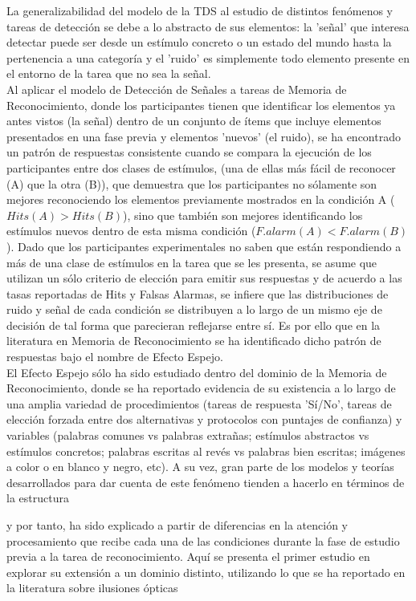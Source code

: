 La generalizabilidad del modelo de la TDS al estudio de distintos fenómenos y tareas de detección se debe a lo abstracto de sus elementos: la 'señal' que interesa detectar puede ser desde un estímulo concreto o un estado del mundo hasta la pertenencia a una categoría y el 'ruido' es simplemente todo elemento presente en el entorno de la tarea que no sea la señal.\\ 

Al aplicar el modelo de Detección de Señales a tareas de Memoria de Reconocimiento, donde los participantes tienen que identificar los elementos ya antes vistos (la señal) dentro de un conjunto de ítems que incluye elementos presentados en una fase previa y elementos 'nuevos' (el ruido), se ha encontrado un patrón de respuestas consistente cuando se compara la ejecución de los participantes entre dos clases de estímulos, (una de ellas más fácil de reconocer (A) que la otra (B)), que demuestra que los participantes no sólamente son mejores reconociendo los elementos previamente mostrados en la condición A ($Hits(A)>Hits(B)$), sino que también son mejores identificando los estímulos nuevos dentro de esta misma condición ($F.alarm(A)<F.alarm(B)$). Dado que los participantes experimentales no saben que están respondiendo a más de una clase de estímulos en la tarea que se les presenta, se asume que utilizan un sólo criterio de elección para emitir sus respuestas y de acuerdo a las tasas reportadas de Hits y Falsas Alarmas, se infiere que las distribuciones de ruido y señal de cada condición se distribuyen a lo largo de un mismo eje de decisión de tal forma que parecieran reflejarse entre sí. Es por ello que en la literatura en Memoria de Reconocimiento se ha identificado dicho patrón de respuestas bajo el nombre de Efecto Espejo.\\

El Efecto Espejo sólo ha sido estudiado dentro del dominio de la Memoria de Reconocimiento, donde se ha reportado evidencia de su existencia a lo largo de una amplia variedad de procedimientos (tareas de respuesta 'Sí/No', tareas de elección forzada entre dos alternativas y protocolos con puntajes de confianza) y variables (palabras comunes vs palabras extrañas; estímulos abstractos vs estímulos concretos; palabras escritas al revés vs palabras bien escritas; imágenes a color o en blanco y negro, etc). A su vez, gran parte de los modelos y teorías desarrollados para dar cuenta de este fenómeno tienden a hacerlo en términos de la estructura 

y por tanto, ha sido explicado a partir de diferencias en la atención y procesamiento que recibe cada una de las condiciones durante la fase de estudio previa a la tarea de reconocimiento. Aquí se presenta el primer estudio en explorar su extensión a un dominio distinto, utilizando lo que se ha reportado en la literatura sobre ilusiones ópticas



